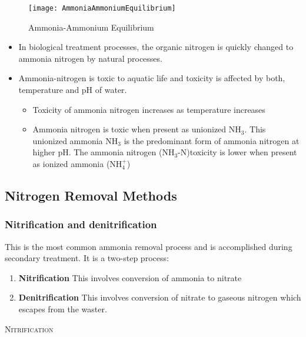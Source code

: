 \begin{figure}
	\begin{center}
		\texttt{[image: AmmoniaAmmoniumEquilibrium]}
			\caption{Ammonia-Ammonium Equilibrium}
	\end{center}
	
	\end{figure}
	\begin{itemize}
		\item In biological treatment processes, the organic nitrogen is quickly changed to ammonia nitrogen by natural processes.
		\item Ammonia-nitrogen is toxic to aquatic life and toxicity is affected by both, temperature and pH of water. 
			\begin{itemize}
				\item Toxicity of ammonia nitrogen increases as temperature increases
				\item Ammonia nitrogen is toxic when present as unionized NH$_3$.  This unionized ammonia NH$_3$ is the predominant form of ammonia nitrogen at higher pH.  The ammonia nitrogen (NH$_3$-N)toxicity is lower when present as  ionized ammonia (NH$_4^+$)
			\end{itemize}
	\end{itemize}
	\vspace{0.3cm}
	
	\subsection{Nitrogen Removal Methods}
	
		\subsubsection{Nitrification and denitrification}

This is the most common ammonia removal process and is accomplished during secondary treatment.  It is a two-step process:
			\begin{enumerate}
				\item \textbf{Nitrification} This involves conversion of ammonia to nitrate
				\item \textbf{Denitrification} This involves conversion of nitrate to gaseous nitrogen which escapes from the waster.
			\end{enumerate}


\noindent\textsc{{Nitrification}}%

